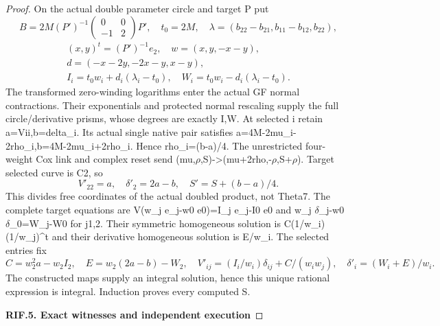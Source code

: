 \begin{proof}
On the actual double parameter circle and target P\textquotesingle{} put
\[
B=2M(P')^{-1}\begin{pmatrix}0&0\\-1&2\end{pmatrix}P',\quad
t_0=2M,\quad\lambda=(b_{22}-b_{21},b_{11}-b_{12},b_{22}),
\]
\[
\begin{gathered}(x,y)^t=(P')^{-1}e_2,\quad w=(x,y,-x-y),\\
d=(-x-2y,-2x-y,x-y),\\
I_i=t_0w_i+d_i(\lambda_i-t_0),\quad W_i=t_0w_i-d_i(\lambda_i-t_0).\end{gathered}
\tag{RIF.11}
\]
The transformed zero-winding logarithms enter the actual GF normal
contractions. Their exponentials and protected normal rescaling supply
the full circle/derivative prisms, whose degrees are exactly I,W.
At selected i retain a=Vii,b=delta\_i. Its actual single native pair
satisfies a=4M-2mu\_i-2rho\_i,b=4M-2mu\_i+2rho\_i. Hence rho\_i=(b-a)/4.
The unrestricted four-weight Cox link and complex reset send
(mu,\(\rho\),S)-\textgreater(mu+2rho,-\(\rho\),S+\(\rho\)). Target selected curve is C2, so
\[
V'_{22}=a,\quad\delta'_2=2a-b,\quad S'=S+(b-a)/4.\tag{RIF.12}
\]
This divides free coordinates of the actual doubled product, not Theta7.
The complete target equations are
V\textquotesingle(w\_j e\_j-w0 e0)=I\_j e\_j-I0 e0 and
w\_j \(\delta\)\textquotesingle\_j-w0 \(\delta\)\textquotesingle\_0=W\_j-W0 for j1,2.
Their symmetric homogeneous solution is C(1/w\_i)(1/w\_j)\^{}t and their
derivative homogeneous solution is E/w\_i. The selected entries fix
\[
C=w_2^2a-w_2I_2,\quad E=w_2(2a-b)-W_2,\quad
V'_{ij}=(I_i/w_i)\delta_{ij}+C/(w_iw_j),\quad
\delta'_i=(W_i+E)/w_i.\tag{RIF.13}
\]
The constructed maps supply an integral solution, hence this unique
rational expression is integral. Induction proves every computed S.

\par

\medskip\noindent\textbf{RIF.5. Exact witnesses and independent execution}

\par\nobreak


\end{proof}
